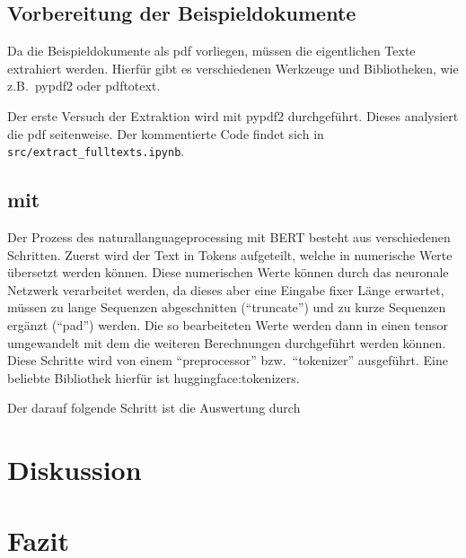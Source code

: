 \documentclass[
german,
]{bachelor}
\begin{document}
\subsection{Vorbereitung der Beispieldokumente}
Da die Beispieldokumente als \gls{pdf} vorliegen,
müssen die eigentlichen Texte extrahiert werden.
Hierfür gibt es verschiedenen Werkzeuge und Bibliotheken,
wie z.B.\, \gls{pypdf2} oder \gls{pdftotext}.

Der erste Versuch der Extraktion wird mit \gls{pypdf2} durchgeführt.
Dieses analysiert die \gls{pdf} seitenweise.
Der kommentierte Code findet sich in \texttt{src/extract\_fulltexts.ipynb}.

\subsection{ mit }
Der Prozess des \gls{naturallanguageprocessing} mit \gls{BERT} besteht aus verschiedenen Schritten.
Zuerst wird der Text in Tokens aufgeteilt,
welche in numerische Werte übersetzt werden können.
Diese numerischen Werte können durch das neuronale Netzwerk verarbeitet werden,
da dieses aber eine Eingabe fixer Länge erwartet,
müssen zu lange Sequenzen abgeschnitten (\enquote{truncate})
und zu kurze Sequenzen ergänzt (\enquote{pad}) werden.
Die so bearbeiteten Werte werden dann in einen \gls{tensor} umgewandelt
mit dem die weiteren Berechnungen durchgeführt werden können.
Diese Schritte wird von einem \enquote{preprocessor}
bzw.\, \enquote{tokenizer} ausgeführt.
\autocite{huggingface:docs:Transformers:preprocessing}
Eine beliebte Bibliothek hierfür ist \gls{huggingface:tokenizers}.



Der darauf folgende Schritt ist die Auswertung durch


\section{Diskussion}

\section{Fazit}
\end{document}
